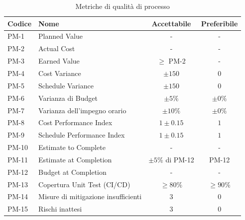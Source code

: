 \documentclass[a4paper,11pt,oneside]{scrartcl}
\begin{document}
\begin{table}[H]
    \centering
    \renewcommand{\arraystretch}{1.3}
    \begin{tabularx}{\textwidth}{@{}p{}Xcc@{}}
        \toprule
        \textbf{Codice} & \textbf{Nome}                       & \textbf{Accettabile} & \textbf{Preferibile} \\
        \midrule
        PM-1            & Planned Value                       & -                    & -                    \\
        PM-2            & Actual Cost                         & -                    & -                    \\
        PM-3            & Earned Value                        & $\geq$ PM-2          & -                    \\
        PM-4            & Cost Variance                       & $\pm 150$            & $0$                  \\
        PM-5            & Schedule Variance                   & $\pm 150$            & $0$                  \\
        PM-6            & Varianza di Budget                  & $\pm 5\%$            & $\pm 0\%$            \\
        PM-7            & Varianza dell'impegno orario        & $\pm 10\%$           & $\pm 0\%$            \\
        PM-8            & Cost Performance Index              & $1 \pm 0.15$         & $1$                  \\
        PM-9            & Schedule Performance Index          & $1 \pm 0.15$         & $1$                  \\
        PM-10           & Estimate to Complete                & -                    & -                    \\
        PM-11           & Estimate at Completion              & $\pm 5\%$ di PM-12   & PM-12                \\
        PM-12           & Budget at Completion                & -                    & -                    \\
        PM-13           & Copertura Unit Test (CI/CD)         & $\ge 80\%$           & $\ge 90\%$           \\
        PM-14           & Misure di mitigazione insufficienti & $3$                  & $0$                  \\
        PM-15           & Rischi inattesi                     & $3$                  & $0$                  \\
        \bottomrule
    \end{tabularx}
    \caption{Metriche di qualità di processo}
\end{table}
\end{document}
